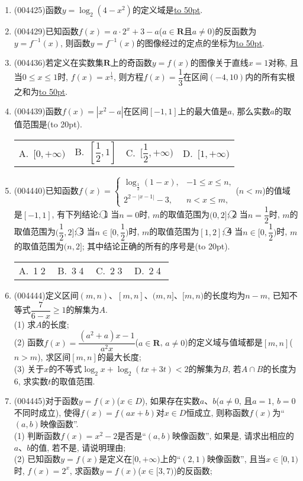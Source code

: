 \documentclass[10pt,a4paper]{article}
\newcommand{\blank}[1]{\underline{\hbox to #1pt{}}}
\newcommand{\bracket}[1]{(\hbox to #1pt{})}
\newcommand{\fourch}[4]{\par\begin{tabular}{p{.23\textwidth}p{.23\textwidth}p{.23\textwidth}p{.23\textwidth}}
A.~#1 &B.~#2& C.~#3& D.~#4
\end{tabular}}
\begin{document}
\begin{enumerate}[1.]
\item {\tiny (004425)}函数$y=\log_2(4-x^2)$的定义域是\blank{50}.
\item {\tiny (004429)}已知函数$f(x)=a\cdot 2^x+3-a$($a\in \mathbf{R}$且$a\ne 0$)的反函数为$y=f^{-1}(x)$, 则函数$y=f^{-1}(x)$的图像经过的定点的坐标为\blank{50}.
\item {\tiny (004436)}若定义在实数集$\mathbf{R}$上的奇函数$y=f(x)$的图像关于直线$x=1$对称, 且当$0\le x\le 1$时, $f(x)=x^{\frac 13}$, 则方程$f(x)=\dfrac 13$在区间$(-4,10)$内的所有实根之和为\blank{50}.
\item {\tiny (004439)}函数$f(x)=|x^2-a|$在区间$[-1,1]$上的最大值是$a$, 那么实数$a$的取值范围是\bracket{20}.
\fourch{$[0,+\infty)$}{$[\dfrac 12,1]$}{$[\dfrac 12,+\infty)$}{$[1,+\infty)$}
\item {\tiny (004440)}已知函数$f(x)=\begin{cases}\log_{\frac 12}(1-x), & -1\le x\le n,  \\ 2^{2-|x-1|}-3, & n<x\le m,  \end{cases}$($n<m$)的值域是$[-1,1]$, 有下列结论:
\textcircled{1} 当$n=0$时, $m$的取值范围为$(0,2]$; \textcircled{2}  当$n=\dfrac 12$时, $m$的取值范围为$(\dfrac 12,2]$; \textcircled{3}  当$n\in [0,\dfrac 12)$时, $m$的取值范围为$[1,2]$; \textcircled{4}  当$n\in [0,\dfrac 12)$时, $m$的取值范围为$(n,2]$;
其中结论正确的所有的序号是\bracket{20}.
\fourch{\textcircled{1}\textcircled{2}}{\textcircled{3}\textcircled{4}}{\textcircled{2}\textcircled{3}}{\textcircled{2}\textcircled{4}}
\item {\tiny (004444)}定义区间$(m,n)$、$[m,n]$、$(m,n]$、$[m,n)$的长度均为$n-m$, 已知不等式$\dfrac 7{6-x}\ge 1$的解集为$A$.\\
(1) 求$A$的长度;\\
(2) 函数$f(x)=\dfrac{(a^2+a)x-1}{a^2x}$($a\in \mathbf{R}$, $a\ne 0$)的定义域与值域都是$[m,n]$($n>m$), 求区间$[m,n]$的最大长度;\\
(3) 关于$x$的不等式$\log_2x+\log_2(tx+3t)<2$的解集为$B$, 若$A\cap B$的长度为$6$, 求实数$t$的取值范围.
\item {\tiny (004445)}对于函数$y=f(x)$($x\in D$), 如果存在实数$a$、$b$($a\ne 0$, 且$a=1$, $b=0$不同时成立), 使得$f(x)=f(ax+b)$对$x\in D$恒成立, 则称函数$f(x)$为``$(a,b)$映像函数''.\\
(1) 判断函数$f(x)=x^2-2$是否是``$(a,b)$映像函数'', 如果是, 请求出相应的$a$、$b$的值, 若不是, 请说明理由;\\
(2) 已知函数$y=f(x)$是定义在$[0,+\infty)$上的``$(2,1)$映像函数'', 且当$x\in [0,1)$时, $f(x)=2^x$, 求函数$y=f(x)$($x\in [3,7)$)的反函数;\\

\end{enumerate}
\end{document}
